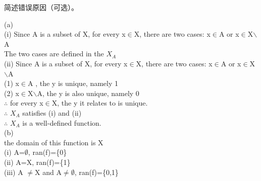 \documentclass[11pt, a4paper, UTF8]{ctexart}
\begin{document}
\begin{cause}
  简述错误原因（可选）。
\end{cause}

\begin{revision}
(a)\\
(i) Since A is a subset of X, for every x$\in$X, there are two cases: x$\in$A or x$\in$X$\backslash$A\\
The two cases are defined in the $X_A$\\
(ii) Since A is a subset of X, for every x$\in$X, there are two cases: x$\in$A or x$\in$X$\backslash$A\\
(1) x$\in$A , the y is unique, namely 1\\
(2) x$\in$X$\backslash$A, the y is also unique, namely 0\\
$\therefore$ for every x$\in$X, the y it relates to is unique.\\
$\therefore$ $X_A$ satisfies (i) and (ii)\\
$\therefore$ $X_A$ is a well-defined function. \\
(b)\\
the domain of this function is X\\
(i) A=$\emptyset$, ran(f)=\{0\}\\
(ii) A=X, ran(f)=\{1\}\\
(iii) A $\not=$X and A$\not=\emptyset$, ran(f)=\{0,1\}\\

\end{revision}
\end{document}
